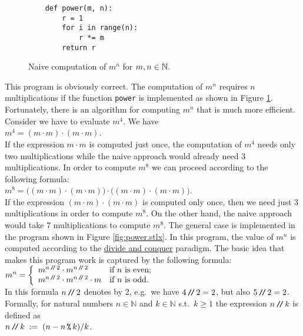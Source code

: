 \begin{figure}[!h]
  \centering
\begin{verbatim}
    def power(m, n):
        r = 1
        for i in range(n):
            r *= m
        return r
\end{verbatim}
\vspace*{-0.3cm}
  \caption{Naive computation of $m^n$ for  $m,n \in {\mathbb N}$.}
  \label{fig:power-naive.stlx}
\end{figure} 

This program is obviously correct.  The computation of $m^n$ requires $n$ multiplications if the
function \texttt{power}  is implemented as shown in Figure \ref{fig:power-naive.stlx}.
Fortunately, there is an algorithm for computing $m^n$ that is much more efficient.
Consider we have to evaluate $m^4$.  We have
 \\[0.2cm]
\hspace*{1.3cm} 
$m^4 = (m \cdot m) \cdot (m \cdot m)$.
\\[0.2cm]
If the expression $m\cdot m$ is computed just once, the computation of
$m^4$ needs only two multiplications while the naive approach would already need 3 multiplications.
In order to compute $m^8$ we can proceed according to the following formula: \\[0.2cm]
\hspace*{1.3cm} 
$m^8 = \bigl( (m \cdot m) \cdot (m \cdot m) \bigr) \cdot \bigl( (m \cdot m) \cdot (m \cdot m)
\bigr)$. 
\\[0.2cm]
If the expression $(m \cdot m) \cdot (m \cdot m)$ is computed only once, then we need just 3 multiplications
in order to compute $m^8$.   On the other hand, the naive approach would take 7 multiplications to
compute $m^8$.  The general case is implemented in the program shown in Figure \ref{fig:power.stlx}.  
In this program, the value of $m^n$ is computed according to the 
\href{http://en.wikipedia.org/wiki/Divide_and_conquer_algorithm}{divide and conquer} paradigm.
The basic idea that makes this program work is captured by the following formula: 
\\[0.2cm] 
\hspace*{1.3cm} 
$m^n = 
\left\{\begin{array}{ll}
m^{n\mbox{\scriptsize\,\texttt{/}$\!$\texttt{/}\,} 2} \cdot m^{n\mbox{\scriptsize\,\texttt{/}$\!$\texttt{/}\,} 2}          & \mbox{if $n$ is even};    \\
m^{n\mbox{\scriptsize\,\texttt{/}$\!$\texttt{/}\,} 2} \cdot m^{n\mbox{\scriptsize\,\texttt{/}$\!$\texttt{/}\,} 2} \cdot m  & \mbox{if $n$ is odd}.
\end{array}
\right.
$
\\[0.2cm] 
In this formula $n \mbox{\,\texttt{/}$\!$\texttt{/}\,}  2$ denotes  by $2$, e.g.~we have $4 \mbox{\,\texttt{/}$\!$\texttt{/}\,}  2 = 2$, but also $5 \mbox{\,\texttt{/}$\!$\texttt{/}\,}  2 =
2$.
Formally, for natural numbers $n \in \mathbb{N}$ and $k \in \mathbb{N}$ s.t.~$k\geq 1$ the expression 
$n \mbox{\,\texttt{/}$\!$\texttt{/}\,} k $ is defined as
\\[0.2cm]
\hspace*{1.3cm}
$n \mbox{\,\texttt{/}$\!$\texttt{/}\,} k \;:=\; (n - n \,\texttt{\%}\, k) / k$.

